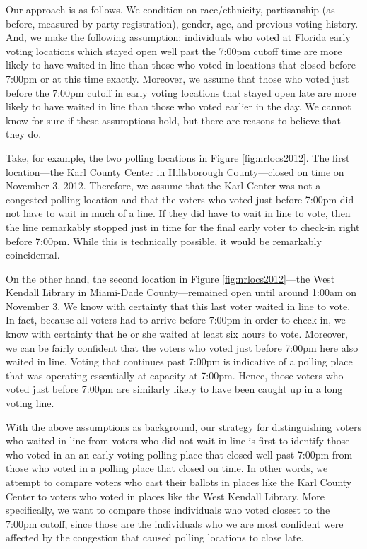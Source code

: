 \documentclass[12pt,titlepage]{article}
\begin{document}

Our approach is as follows.  We condition on race/ethnicity,
partisanship (as before, measured by party registration), gender, age,
and previous voting history.  And, we make the following assumption:
individuals who voted at Florida early voting locations which stayed
open well past the 7:00pm cutoff time are more likely to have waited
in line than those who voted in locations that closed before 7:00pm or
at this time exactly.  Moreover, we assume that those who voted just
before the 7:00pm cutoff in early voting locations that stayed open
late are more likely to have waited in line than those who voted
earlier in the day.  We cannot know for sure if these assumptions
hold, but there are reasons to believe that they do.

Take, for example, the two polling locations in Figure
\ref{fig:nrlocs2012}.  The first location---the Karl County Center in
Hillsborough County---closed on time on November 3, 2012.  Therefore,
we assume that the Karl Center was not a congested polling location
and that the voters who voted just before 7:00pm did not have to wait
in much of a line.  If they did have to wait in line to vote, then the
line remarkably stopped just in time for the final early voter to
check-in right before 7:00pm.  While this is technically possible, it
would be remarkably coincidental.

On the other hand, the second location in Figure
\ref{fig:nrlocs2012}---the West Kendall Library in Miami-Dade
County---remained open until around 1:00am on November 3.  We know
with certainty that this last voter waited in line to vote.  In fact,
because all voters had to arrive before 7:00pm in order to check-in,
we know with certainty that he or she waited at least six hours to
vote.  Moreover, we can be fairly confident that the voters who voted
just before 7:00pm here also waited in line.  Voting that continues
past 7:00pm is indicative of a polling place that was operating
essentially at capacity at 7:00pm.  Hence, those voters who voted just
before 7:00pm are similarly likely to have been caught up in a long
voting line.

With the above assumptions as background, our strategy for
distinguishing voters who waited in line from voters who did not wait
in line is first to identify those who voted in an an early voting
polling place that closed well past 7:00pm from those who voted in a
polling place that closed on time.  In other words, we attempt to
compare voters who cast their ballots in places like the Karl County
Center to voters who voted in places like the West Kendall Library.
More specifically, we want to compare those individuals who voted
closest to the 7:00pm cutoff, since those are the individuals who we
are most confident were affected by the congestion that caused polling
locations to close late.
 
\end{document}
